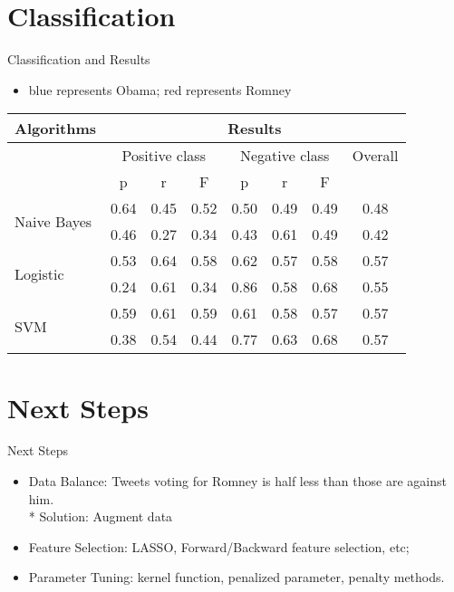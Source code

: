 \documentclass{beamer}
\begin{document}
\section{Classification}
\begin{frame}{Classification and Results}
\begin{itemize}
	\item \color{blue} blue \color{black} represents Obama; \color{red} red \color{black}represents Romney
\end{itemize}
\begin{center}
\begin{tabular}{|p{2cm}|c c c| c c c| c|}
\hline
Algorithms & \multicolumn{7}{|c|}{Results} \\
\hline
&\multicolumn{3}{|c|}{Positive class} & \multicolumn{3}{c|}{Negative class} & Overall\\
\hline
& p & r & F  & p & r & F  &\\
\hline
\multirow{2}{*}{Naive Bayes} & \color{blue}0.64 & \color{blue}0.45 & \color{blue} 0.52& \color{blue}0.50 & \color{blue}0.49 &\color{blue}0.49 & \color{blue} 0.48\\
 &\color{red} 0.46 &\color{red}0.27  &\color{red} 0.34  & \color{red}0.43  & \color{red}0.61 & \color{red}0.49 &\color{red} 0.42\\
\hline
\multirow{2}{*}{Logistic} & \color{blue}0.53 & \color{blue} 0.64& \color{blue}0.58 & \color{blue} 0.62& \color{blue} 0.57 &\color{blue} 0.58 & \color{blue} 0.57\\
 &\color{red}0.24  &\color{red}0.61  &\color{red} 0.34  & \color{red}0.86  & \color{red}0.58 & \color{red} 0.68 &\color{red} 0.55 \\
\hline
\multirow{2}{*}{SVM} & \color{blue} 0.59 & \color{blue} 0.61 & \color{blue} 0.59 & \color{blue} 0.61 &\color{blue} 0.58 & \color{blue} 0.57 & \color{blue} 0.57\\
 & \color{red} 0.38 & \color{red} 0.54 & \color{red} 0.44 &  \color{red} 0.77 & \color{red} 0.63 & \color{red} 0.68 & \color{red} 0.57\\
\hline

\end{tabular}
\end{center}
\end{frame}

\section{Next Steps}
\begin{frame}{Next Steps}
\begin{itemize}
	\item Data Balance: Tweets voting for Romney is half less than those are against him.\\*
		Solution: Augment data
	\item Feature Selection: LASSO, Forward/Backward feature selection, etc;
	\item Parameter Tuning: kernel function, penalized parameter, penalty methods.
\end{itemize}

\end{frame}
\end{document}
